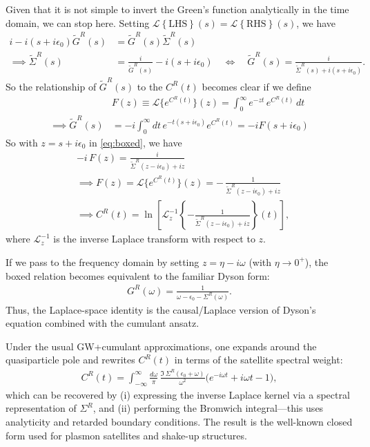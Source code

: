 Given that it is not simple to invert the Green's function analytically in the time domain, we can stop here. \color{red}{But perhaps you can think of certain limits where this inversion is possible to do numerically?} \color{black}Setting $\mathcal{L}\left\{\text{LHS}\right\}(s)=\mathcal{L}\left\{\text{RHS}\right\}(s)$, we have
\begin{align}
i - i(s + i\epsilon_0)\tilde{G}^R(s) &= \tilde{G}^R(s) \tilde{\Sigma}^R(s) \\
\implies \tilde{\Sigma}^R(s)
&= \frac{i}{\tilde{G}^R(s)} - i(s + i\epsilon_0)
\quad\Longleftrightarrow\quad
\tilde{G}^R(s)
= \frac{i}{\tilde{\Sigma}^R(s) + i(s + i\epsilon_0)}. \label{eq:boxed}
\end{align}
So the relationship of $\tilde{G}^R(s)$ to the $C^R(t) $ becomes clear if we define
\begin{align}
&F(z) \equiv \mathcal{L}\{e^{C^R(t)}\}(z)
= \int_0^\infty e^{-z t}\,e^{C^R(t)}\,dt\\
\implies \tilde{G}^R(s) &= -i \int_0^\infty dt\, e^{-t(s + i\epsilon_0)} e^{C^R(t)} = -i F(s + i\epsilon_0)
\end{align}
So with
$z = s + i\epsilon_0$ in \eqref{eq:boxed}, we have
\begin{align}
&-i\,F(z)
= \frac{i}{\tilde{\Sigma}^R(z - i\epsilon_0) + i z}\\
&\implies 
F(z)
= \mathcal{L}\{e^{C^R(t)}\}(z)
= -\,\frac{1}{\tilde{\Sigma}^R(z - i\epsilon_0) + i z}\\
& \implies
C^R(t)
= \ln\!\left[
\mathcal{L}^{-1}_z
\left\{
-\frac{1}{\tilde{\Sigma}^R(z - i\epsilon_0) + i z}
\right\}(t)
\right],
\end{align}
where $\mathcal{L}^{-1}_z$ is the inverse Laplace transform with respect to $z$.

If we pass to the frequency domain by setting
$z = \eta - i\omega$ (with $\eta \to 0^+$),
the boxed relation becomes equivalent to the familiar Dyson form:
\begin{align}
G^R(\omega)
= \frac{1}{\omega - \epsilon_0 - \Sigma^R(\omega)}.
\end{align}
Thus, the Laplace-space identity is the causal/Laplace version of
Dyson’s equation combined with the cumulant ansatz.

Under the usual GW+cumulant approximations,
one expands around the quasiparticle pole and rewrites
$C^R(t)$ in terms of the satellite spectral weight:
\begin{align}
C^R(t)
= \int_{-\infty}^{\infty}
\frac{d\omega}{\pi}\,
\frac{\Im\,\Sigma^R(\epsilon_0 + \omega)}{\omega^2}
\big(e^{-i\omega t} + i\omega t - 1\big),
\end{align}
which can be recovered by (i) expressing the inverse Laplace kernel
via a spectral representation of $\Sigma^R$, and
(ii) performing the Bromwich integral—this uses analyticity and
retarded boundary conditions.
The result is the well-known closed form used for plasmon satellites
and shake-up structures.

